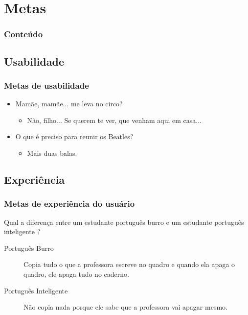 \documentclass[14pt,beamer]{beamer}
\begin{document}
\section{Metas}

\begin{frame}
	\frametitle{Conteúdo}
	\footnotesize
\end{frame}

\subsection{Usabilidade}
\begin{frame}
	\frametitle{Metas de usabilidade}

\begin{itemize}
	\item Mamãe, mamãe... me leva no circo? 
		\begin{itemize}
			\item Não, filho... Se querem te 
			ver, que venham aqui em casa...
		\end{itemize}
	\item O que é preciso para reunir os Beatles? 
	\begin{itemize}
		\item Mais duas balas.
	\end{itemize}
\end{itemize}

\end{frame}

\subsection{Experiência}
\begin{frame}
	\frametitle{Metas de experiência do usuário}

Qual a diferença entre um estudante português burro e um estudante português inteligente ?
\begin{description}
	\item[Português Burro] Copia tudo o que a professora escreve no
		quadro e quando ela apaga o quadro, ele apaga tudo no caderno.
	\item[Português Inteligente] Não copia nada porque ele sabe que a
	professora vai apagar mesmo.
\end{description}

\end{frame}
\end{document}
